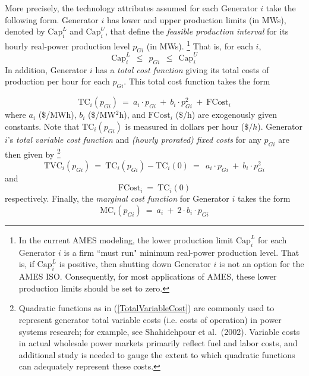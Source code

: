 \documentclass[12pt]{article}
\begin{document}
   More precisely, the technology attributes assumed for each Generator $i$ take the following form.
Generator $i$ has lower and upper production limits (in MWs), denoted by $\mbox{Cap}^L_{i}$ 
and $\mbox{Cap}^U_{i}$,
that define the \textit{feasible production interval\/} 
for its hourly real-power production level
$p_{Gi}$ (in MWs).%
    \footnote{In the current AMES modeling, the lower production limit $\mbox{Cap}^L_{i}$ 
for each Generator $i$ is a firm ``must run" minimum real-power production level.  
That is, if $\mbox{Cap}^L_{i}$ is positive, then shutting down Generator $i$ is not an option 
for the AMES ISO.  Consequently, for most applications of AMES, these lower production limits 
should be set to zero.\label{FirmLowerProdLimits} }                         
     That is, for each $i$,
              \begin{equation}  \label{TruePI}
     \mbox{Cap}^L_{i} ~~ \le ~~ p_{Gi} ~~ \le ~~ \mbox{Cap}^U_{i}
                \end{equation}
In addition, Generator $i$ has a {\it total cost function\/} giving its
total costs of production per hour for each $p_{Gi}$.  This total 
cost function takes the form

                 \begin{equation} \label{TotalCost}
     \mbox{TC}_i(p_{Gi}) ~ = ~ a_i\cdot p_{Gi}
                             ~+~ b_i\cdot p_{Gi}^2 ~+~ \mbox{FCost}_i
                    \end{equation}                  
where $a_i$ ($\$$/MWh), $b_i$ ($\$$/MW$^2$h), and
$\mbox{FCost}_i$ ($\$$/h) are exogenously given constants. 
Note that $\mbox{TC}_i(p_{Gi})$ is measured in dollars per hour ($\$/h$).
Generator $i$'s \textit{total variable cost function\/} and \textit{(hourly prorated) fixed
costs} for any $p_{Gi}$ are then given by%
		\footnote{Quadratic functions as in (\ref{TotalVariableCost}) are commonly used to represent generator total variable costs (i.e. costs of operation) in power systems research; for example, see Shahidehpour et al.~(2002).  Variable costs in actual wholesale power markets primarily reflect fuel and labor costs, and additional study is needed to gauge the extent to which quadratic functions can adequately represent these costs.}
     \begin{equation} \label{TotalVariableCost}
          \mbox{TVC}_i(p_{Gi}) ~ = ~ \mbox{TC}_i(p_{Gi}) - \mbox{TC}_i(0) ~=~ ~ a_i\cdot p_{Gi}
                             ~+~ b_i\cdot p^2_{Gi} 
      \end{equation}
and 
             \begin{equation}
       \mbox{FCost}_i ~ = ~ \mbox{TC}_i(0)
              \end{equation}
respectively.  Finally, the \textit{marginal cost function\/} for Generator $i$ takes the form
              \begin{equation} \label{MarginalCost}
     \mbox{MC}_i(p_{Gi}) ~ = ~ a_i  ~+~ 2\cdot b_i\cdot p_{Gi}
                    \end{equation}
\end{document}

